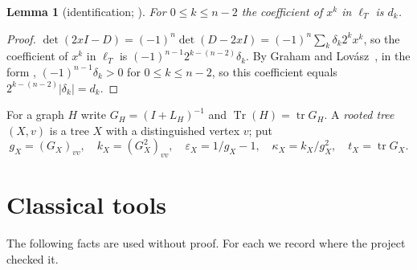 \documentclass[11pt]{amsart}
\newtheorem{lemma}[theorem]{Lemma}
\theoremstyle{definition}
\theoremstyle{remark}
\newcommand{\tr}{\operatorname{tr}}
\newcommand{\Tr}{\operatorname{Tr}}
\begin{document}
\begin{lemma}[identification; {\cite[Observation~3.1]{AAB}}]\label{lem:ident}
For $0\le k\le n-2$ the coefficient of $x^k$ in $\ell_T$ is $d_k$.
\end{lemma}

\begin{proof}
$\det(2xI-D)=(-1)^n\det(D-2xI)=(-1)^n\sum_k\delta_k2^kx^k$, so the coefficient
of $x^k$ in $\ell_T$ is $(-1)^{n-1}2^{k-(n-2)}\delta_k$. By Graham and
Lov\'asz~\cite{GL78}, in the form \cite[Fact~1.1]{AAB}, $(-1)^{n-1}\delta_k>0$
for $0\le k\le n-2$, so this coefficient equals $2^{k-(n-2)}|\delta_k|=d_k$.
\end{proof}

For a graph $H$ write $G_H=(I+L_H)^{-1}$ and $\Tr(H)=\tr G_H$. A
\emph{rooted tree} $(X,v)$ is a tree $X$ with a distinguished vertex $v$; put
\[
g_X=(G_X)_{vv},\quad k_X=(G_X^2)_{vv},\quad \varepsilon_X=1/g_X-1,\quad
\kappa_X=k_X/g_X^2,\quad t_X=\tr G_X .
\]

\section{Classical tools}\label{sec:tools}

The following facts are used without proof. For each we record where the
project checked it.
\end{document}
